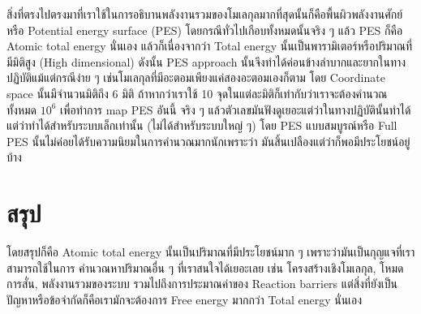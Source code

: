 สิ่งที่ตรงไปตรงมาที่เราใช้ในการอธิบานพลังงานรวมของโมเลกุลมากที่สุดนั้นก็คือพื้นผิวพลังงานศักย์หรือ Potential energy 
surface (PES) โดยกรณีทั่วไปเกือบทั้งหมดนั้นจริง ๆ แล้ว PES ก็คือ Atomic total energy นั่นเอง 
แล้วก็เนื่องจากว่า Total energy นั้นเป็นพารามิเตอร์หรือปริมาณที่มีมิติสูง (High dimensional) ดังนั้น PES approach 
นั้นจึงทำได้ค่อนข้างลำบากและยากในทางปฏิบัติแม้แต่กรณีง่าย ๆ เช่นโมเลกุลที่มีอะตอมเพียงแค่สองอะตอมเองก็ตาม 
โดย Coordinate space นั้นมีจำนวนมิติถึง 6 มิติ ถ้าหากว่าเราใช้ 10 จุดในแต่ละมิติก็เท่ากับว่าเราจะต้องคำนวณทั้งหมด 
$10^{6}$ เพื่อทำการ map PES อันนี้ จริง ๆ แล้วตัวเลขมันฟังดูเยอะแต่ว่าในทางปฏิบัตินั้นทำได้แต่ว่าทำได้สำหรับระบบเล็กเท่านั้น 
(ไม่ได้สำหรับระบบใหญ่ ๆ) โดย PES แบบสมบูรณ์หรือ Full PES นั้นไม่ค่อยได้รับความนิยมในการคำนวณมากนักเพราะว่า%
มันสิ้นเปลืองแต่ว่าก็พอมีประโยชน์อยู่บ้าง

\section{สรุป}

โดยสรุปก็คือ Atomic total energy นั้นเป็นปริมาณที่มีประโยชน์มาก ๆ เพราะว่ามันเป็นกุญแจที่เราสามารถใช้ในการ%
คำนวณหาปริมาณอื่น ๆ ที่เราสนใจได้เยอะเลย เช่น โครงสร้างเชิงโมเลกุล, โหมดการสั่น, พลังงานรวมของระบบ 
รวมไปถึงการประมาณค่าของ Reaction barriers แต่สิ่งที่ยังเป็นปัญหาหรือข้อจำกัดก็คือเรามักจะต้องการ Free energy 
มากกว่า Total energy นั่นเอง 
